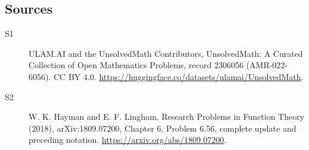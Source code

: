 \documentclass[11pt]{article}
\begin{document}
\subsection{Sources}
\begin{description}
\item[\hypertarget{source:2306056:1}{S1}] ULAM.AI and the UnsolvedMath Contributors, UnsolvedMath: A Curated Collection of Open Mathematics Problems, record 2306056 (AMR-022-6056). CC BY 4.0. \url{https://huggingface.co/datasets/ulamai/UnsolvedMath}.
\item[\hypertarget{source:2306056:2}{S2}] W. K. Hayman and E. F. Lingham, Research Problems in Function Theory (2018), arXiv:1809.07200, Chapter 6, Problem 6.56, complete update and preceding notation. \url{https://arxiv.org/abs/1809.07200}.
\end{description}
\label{end:2306056}
\end{document}
